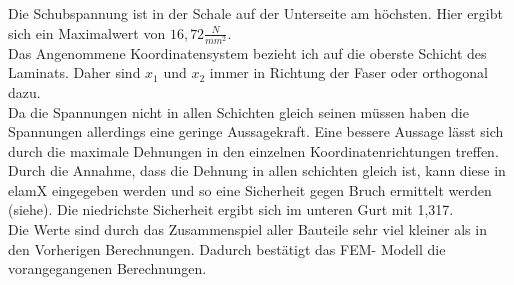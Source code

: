 Die Schubspannung ist in der Schale auf der Unterseite am höchsten. Hier ergibt sich ein Maximalwert von $16,72\frac{N}{mm^2}$.\\
\noindent
Das Angenommene Koordinatensystem bezieht ich auf die oberste Schicht des Laminats. Daher sind $x_{1}$ und $x_{2}$ immer in Richtung der Faser oder orthogonal dazu.\\
Da die Spannungen nicht in allen Schichten gleich seinen müssen haben die Spannungen allerdings eine geringe Aussagekraft. Eine bessere Aussage lässt sich durch die maximale Dehnungen in den einzelnen Koordinatenrichtungen treffen. Durch die Annahme, dass die Dehnung in allen schichten gleich ist, kann diese in elamX eingegeben werden und so eine Sicherheit gegen Bruch ermittelt werden
(siehe). Die niedrichste Sicherheit ergibt sich im unteren Gurt mit 1,317.\\
Die Werte sind durch das Zusammenspiel aller Bauteile sehr viel kleiner als in den Vorherigen Berechnungen. Dadurch bestätigt das FEM- Modell die vorangegangenen Berechnungen.
\newpage
